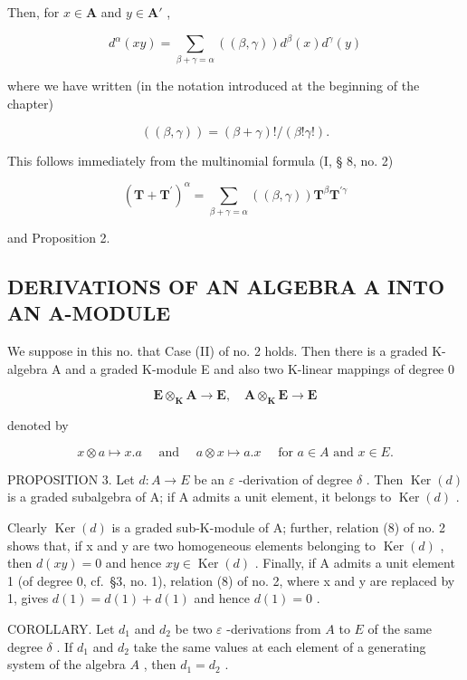 Then, for \(x \in \mathbf{A}\) and \(y \in \mathbf{A}'\) ,

\[
d ^ {\alpha} (x y) = \sum_ {\beta + \gamma = \alpha} ((\beta , \gamma)) d ^ {\beta} (x) d ^ {\gamma} (y)\tag{17}
\]

where we have written (in the notation introduced at the beginning of the chapter)

\[
((\beta , \gamma)) = (\beta + \gamma)! / (\beta ! \gamma!).\tag{18}
\]

This follows immediately from the multinomial formula (I, § 8, no. 2)

\[
(\mathbf {T} + \mathbf {T} ^ {\prime}) ^ {\alpha} = \sum_ {\beta + \gamma = \alpha} ((\beta , \gamma)) \mathbf {T} ^ {\beta} \mathbf {T} ^ {\prime \gamma}
\]

and Proposition 2.

\subsection{DERIVATIONS OF AN ALGEBRA A INTO AN A-MODULE}

We suppose in this no. that Case (II) of no. 2 holds. Then there is a graded K-algebra A and a graded K-module E and also two K-linear mappings of degree 0

\[
\mathbf {E} \otimes_ {\mathbf {K}} \mathbf {A} \rightarrow \mathbf {E}, \quad \mathbf {A} \otimes_ {\mathbf {K}} \mathbf {E} \rightarrow \mathbf {E}
\]

denoted by

\[
x \otimes a \mapsto x. a \quad \text { and } \quad a \otimes x \mapsto a. x \quad \text { for   } a \in A \text {   and   } x \in E.
\]

PROPOSITION 3. Let \(d:A\to E\) be an \(\varepsilon\) -derivation of degree \(\delta\) . Then \(\operatorname{Ker}(d)\) is a graded subalgebra of A; if A admits a unit element, it belongs to \(\operatorname{Ker}(d)\) .

Clearly \(\operatorname{Ker}(d)\) is a graded sub-K-module of A; further, relation (8) of no. 2 shows that, if x and y are two homogeneous elements belonging to \(\operatorname{Ker}(d)\) , then \(d(xy) = 0\) and hence \(xy \in \operatorname{Ker}(d)\) . Finally, if A admits a unit element 1 (of degree 0, cf.~§3, no. 1), relation (8) of no. 2, where x and y are replaced by 1, gives \(d(1) = d(1) + d(1)\) and hence \(d(1) = 0\) .

COROLLARY. Let \(d_1\) and \(d_2\) be two \(\varepsilon\) -derivations from \(A\) to \(E\) of the same degree \(\delta\) . If \(d_1\) and \(d_2\) take the same values at each element of a generating system of the algebra \(A\) , then \(d_1 = d_2\) .

